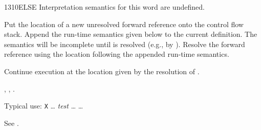 \begin{worddef}{1310}{ELSE}
\interpret
	Interpretation semantics for this word are undefined.

\compile

	Put the location of a new unresolved forward reference
	 onto the control flow stack. Append the run-time
	semantics given below to the current definition. The semantics
	will be incomplete until  is resolved (e.g., by
	). Resolve the forward reference  using
	the location following the appended run-time semantics.

\runtime
	\stack{}{}

	Continue execution at the location given by the resolution of
	.

\see {},
	,
	.

	\begin{rationale} %
		Typical use:
			\word{:} \texttt{X} {\ldots}
				\emph{test}  {\ldots}
				 {\ldots} 
			\word{;}
	\end{rationale}

	\begin{testing} %
		See .
	\end{testing}
\end{worddef}


